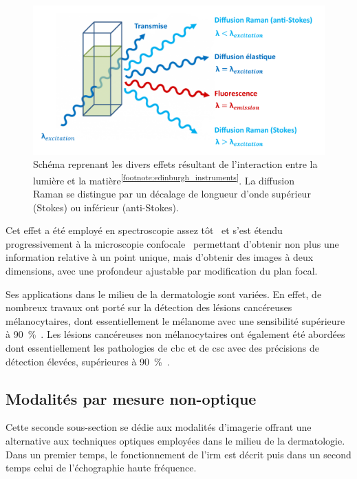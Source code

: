 \begin{figure}[H]
    \centering
    \includegraphics[width=\linewidth]{contents/chapter_2/resources/scheme_principle_raman.pdf}
    \caption{Schéma reprenant les divers effets résultant de l'interaction entre la lumière et la matière\textsuperscript{\ref{footnote:edinburgh_instruments}}. La diffusion Raman se distingue par un décalage de longueur d'onde supérieur (Stokes) ou inférieur (anti-Stokes).}
    \label{fig:scheme_principle_raman}
\end{figure}\par

\addtocounter{footnote}{1}

Cet effet a été employé en spectroscopie assez tôt~\cite{Ferraro2003,Ferraro2003b} et s'est étendu progressivement à la microscopie confocale~\cite{Casper2003} permettant d'obtenir non plus une information relative à un point unique, mais d'obtenir des images à deux dimensions, avec une profondeur ajustable par modification du plan focal.\par

Ses applications dans le milieu de la dermatologie sont variées. En effet, de nombreux travaux ont porté sur la détection des lésions cancéreuses mélanocytaires, dont essentiellement le mélanome avec une sensibilité supérieure à 90~\%~\cite{Lui2012,Schleusener2015}. Les lésions cancéreuses non mélanocytaires ont également été abordées dont essentiellement les pathologies de \gls{cbc} et de \gls{csc} avec des précisions de détection élevées, supérieures à 90~\%~\cite{Lieber2008,Silveira2015}.\par
\clearpage

\subsection{Modalités par mesure non-optique}
Cette seconde sous-section se dédie aux modalités d'imagerie offrant une alternative aux techniques optiques employées dans le milieu de la dermatologie. Dans un premier temps, le fonctionnement de l'\gls{irm} est décrit puis dans un second temps celui de l'échographie haute fréquence.\par

